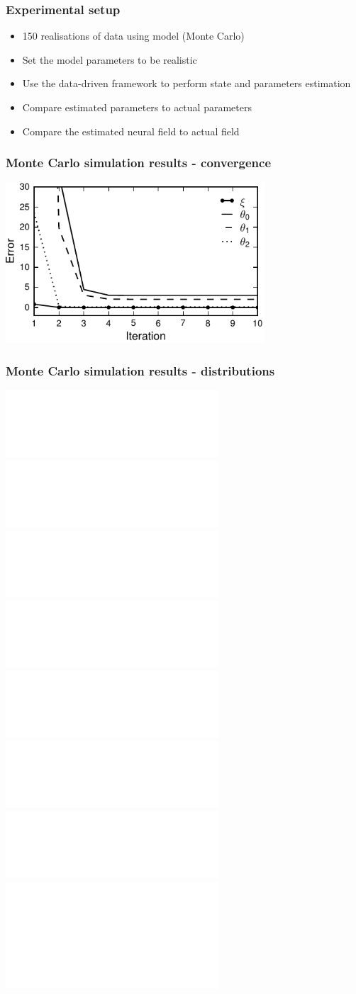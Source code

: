 \documentclass[compress]{beamer}
\begin{document}
\begin{frame}\frametitle{Experimental setup}
\begin{itemize}
	\item 150 realisations of data using model (Monte Carlo)
	\item Set the model parameters to be realistic
	\item Use the data-driven framework to perform state and parameters estimation
	\item Compare estimated parameters to actual parameters
	\item Compare the estimated neural field to actual field
\end{itemize}	
\end{frame}

\begin{frame}\frametitle{Monte Carlo simulation results - convergence}
	\begin{center}
		\includegraphics[height=6cm]{./Figures/fig6.pdf}
	\end{center}
\end{frame}

\begin{frame}\frametitle{Monte Carlo simulation results - distributions}
	\begin{center}
		\includegraphics<1>[height=2.5cm]{./Figures/Figure7a.pdf}
		\includegraphics<1>[height=2.5cm]{./Figures/Figure7b.pdf}
		\includegraphics<1>[height=2.5cm]{./Figures/Figure7c.pdf}
		\includegraphics<1>[height=2.5cm]{./Figures/Figure7d.pdf}\\
		\includegraphics<1>[height=2.5cm]{./Figures/Kernel2.pdf}
		\includegraphics<1>[height=2.5cm]{./Figures/Kernel3.pdf}
		\includegraphics<1>[height=2.5cm]{./Figures/Kernel4.pdf}
		\includegraphics<1>[height=2.cm]{./Figures/PSP.pdf}
\end{center}	
\end{frame}
\end{document}
